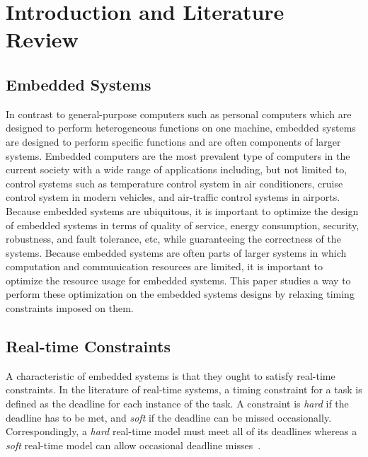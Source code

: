 \section{Introduction and Literature Review} \label{introduction}

\subsection{Embedded Systems}
In contrast to general-purpose computers such as personal computers which are designed to perform heterogeneous functions on one machine, embedded systems are designed to perform specific functions and are often components of larger systems. Embedded computers are the most prevalent type of computers in the current society with a wide range of applications including, but not limited to, control systems such as temperature control system in air conditioners, cruise control system in modern vehicles, and air-traffic control systems in airports. Because embedded systems are ubiquitous, it is important to optimize the design of embedded systems in terms of quality of service, energy consumption, security, robustness, and fault tolerance, etc, while guaranteeing the correctness of the systems. Because embedded systems are often parts of larger systems in which computation and communication resources are limited, it is important to optimize the resource usage for embedded systems. This paper studies a way to perform these optimization on the embedded systems designs by relaxing timing constraints imposed on them.

\subsection{Real-time Constraints}
A characteristic of embedded systems is that they ought to satisfy real-time constraints. In the literature of real-time systems, a timing constraint for a task is defined as the deadline for each instance of the task. A constraint is \emph{hard} if the deadline has to be met, and \emph{soft} if the deadline can be missed occasionally. Correspondingly, a \emph{hard}  real-time model must meet all of its deadlines whereas a \emph{soft} real-time model can allow occasional deadline misses~\cite{liu2000real}.

